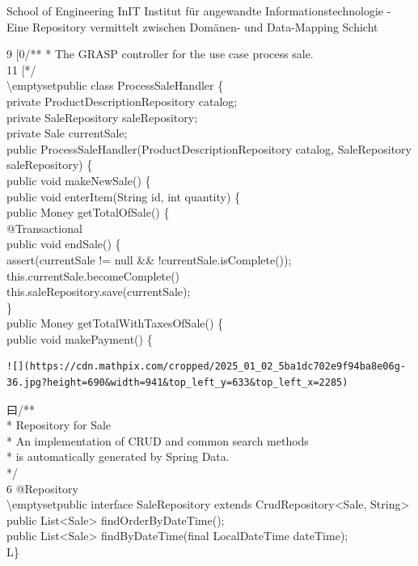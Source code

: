 \documentclass[10pt]{article}
\begin{document}
School of Engineering
InIT Institut für angewandte Informationstechnologie
- Eine Repository vermittelt zwischen Domänen- und Data-Mapping Schicht


9 [0/** * The GRASP controller for the use case process sale.\\
11 [*/\\
\textbackslash emptysetpublic class ProcessSaleHandler \{\\
private ProductDescriptionRepository catalog;\\
private SaleRepository saleRepository;\\
private Sale currentSale;\\
public ProcessSaleHandler(ProductDescriptionRepository catalog, SaleRepository saleRepository) \{\\
public void makeNewSale() \{\\
public void enterItem(String id, int quantity) \{\\
public Money getTotalOfSale() \{\\
@Transactional\\
public void endSale() \{\\
assert(currentSale != null \&\& !currentSale.isComplete());\\
this.currentSale.becomeComplete()\\
this.saleRepository.save(currentSale);\\
\}\\
public Money getTotalWithTaxesOfSale() \{\\
public void makePayment() \{

\begin{verbatim}
![](https://cdn.mathpix.com/cropped/2025_01_02_5ba1dc702e9f94ba8e06g-36.jpg?height=690&width=941&top_left_y=633&top_left_x=2285)
\end{verbatim}

曰/**\\
* Repository for Sale\\
* An implementation of CRUD and common search methods\\
* is automatically generated by Spring Data.\\
*/\\
6 @Repository\\
\textbackslash emptysetpublic interface SaleRepository extends CrudRepository<Sale, String>\\
public List<Sale> findOrderByDateTime();\\
public List<Sale> findByDateTime(final LocalDateTime dateTime);\\
L\}
\end{document}
